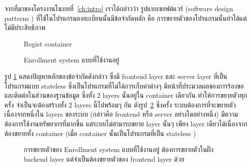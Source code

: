 จากที่มาของโครงงานในบทที่~\ref{ch:intro} เราได้กล่าวว่า รูปแบบซอฟต์แวร์ (software design patterns \cite{sdp}) ที่ใช้ในโปรแกรมลงทะเบียนนั้นมีข้อจำกัดหลัก คือ การขยายตัวของโปรแกรมนั้นทำได้แต่ไม่มีประสิทธิภาพ
%
\begin{figure}
    \centering
    \begin{center}
    Regist container \\
    \end{center}
    \caption{Enrollment system แบบที่ใช้งานอยู่}
    \label{fig:old_regist_system}
\end{figure}
%
รูป \ref{fig:old_regist_system} แสดงปัญหาหลักของข้อจำกัดดังกล่าว ซึ่งมี frontend layer และ server layer ที่เป็นโปรแกรมแบบ stateless ซึ่งเป็นโปรแกรมที่ไม่ได้การเก็บค่าต่างๆ มีหน้าที่ประมวลผลของการร้องขอ และติดต่อในส่วนของฐานข้อมูล ซึ่งทั้ง 2 layers นั้นอยู่ใน container เดียวกัน ทำให้การขยายตัวทุกครั้ง จำเป็นจะต้องสร้างทั้ง 2 layers นี้ไปพร้อมๆ กัน ดังรูป~\ref{fig:scaling_old_regist_system} ซึ่งครั้ง ระบบต้องการที่จะขยายตัวเนื่องจากหนึ่งใน layers ของระบบ (กล่าวคือ frontend หรือ server อย่างใดอย่างหนึ่ง) มีความต้องการใช้งานทรัพยากรที่มากขึ้น แต่ระบบไม่สามารถขยาย layer นั้นๆ เพียง layer เดียวได้เนื่องจากต้องขยายทั้ง container (เมื่อ container นั้นเป็นโปรแกรมที่เป็น stateless \cite{slsf})
%
\begin{figure}
    \centering
    \begin{center}
    \end{center}
    \caption{การขยายตัวของ Enrollment system แบบที่ใช้งานอยู่ ต้องการขยายตัวในฝั่ง backend layer แต่จำเป็นต้องขยายตัวของ frontend layer ด้วย}
    \label{fig:scaling_old_regist_system}
\end{figure}
